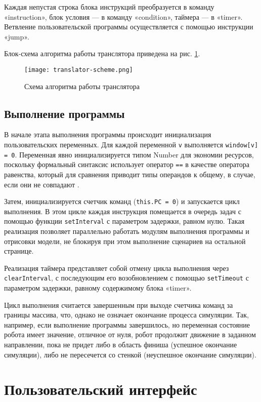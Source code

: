 Каждая непустая строка блока инструкций преобразуется в команду «instruction», блок условия — в команду «condition», таймера — в «timer». Ветвление пользовательской программы осуществляется с помощью инструкции «jump».

Блок-схема алгоритма работы транслятора приведена на рис. \ref{fig:translator-scheme}.

\begin{figure}[htbp]
	\centering
	\texttt{[image: translator-scheme.png]}
	\caption{Схема алгоритма работы транслятора}%
	\label{fig:translator-scheme}
\end{figure}

\subsection{Выполнение программы}

В начале этапа выполнения программы происходит инициализация пользовательских переменных. Для каждой переменной \lstinline|v| выполняется \lstinline|window[v] = 0|. Переменная явно инициализируется типом Number для экономии ресурсов, поскольку формальный синтаксис использует оператор \lstinline|==| в качестве оператора равенства, который для сравнения приводит типы операндов к общему, в случае, если они не совпадают \cite{mdn-sameness}.

Затем, инициализируется счетчик команд (\lstinline|this.PC = 0|) и запускается цикл выполнения. В этом цикле каждая инструкция помещается в очередь задач с помощью  функции \lstinline|setInterval| с параметром задержки, равном нулю. Такая реализация позволяет параллельно работать модулям выполнения программы и отрисовки модели, не блокируя при этом выполнение сценариев на остальной странице.

Реализация таймера представляет собой отмену цикла выполнения через \lstinline|clearInterval|, с последующим его возобновлением с помощью \lstinline|setTimeout| с параметром задержки, равному содержимому блока «timer».

Цикл выполнения считается завершенным при выходе счетчика команд за границы массива, что, однако не означает окончание процесса симуляции. Так, например, если выполнение программы завершилось, но переменная состояние робота имеет значение, отличное от нуля, робот продолжит движение в заданном направлении, пока не придет либо в область финиша (успешное окончание симуляции), либо не пересечется со стенкой (неуспешное окончание симуляции).

 
\section{Пользовательский интерфейс}

